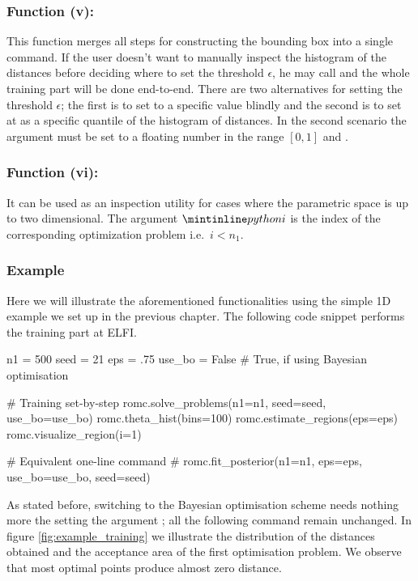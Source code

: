 \subsubsection*{Function (v): }

This function merges all steps for constructing the bounding box into
a single command. If the user doesn't want to manually inspect the
histogram of the distances before deciding where to set the threshold
$\epsilon$, he may call  and the whole
training part will be done end-to-end. There are two alternatives for
setting the threshold $\epsilon$; the first is to set to a specific
value blindly and the second is to set at as a specific quantile of
the histogram of distances. In the second scenario the
 argument must be set to a floating number in the
range $[0,1]$ and .

\subsubsection*{Function (vi): }
  
It can be used as an inspection utility for cases where the parametric
space is up to two dimensional. The argument $\pinline{i}$ is the
index of the corresponding optimization problem i.e.\ $i<n_1$.

\subsubsection*{Example}

Here we will illustrate the aforementioned functionalities using the
simple 1D example we set up in the previous chapter. The following
code snippet performs the training part at ELFI.

\begin{pythoncode}
  n1 = 500
  seed = 21
  eps = .75
  use_bo = False # True, if using Bayesian optimisation

  # Training set-by-step
  romc.solve_problems(n1=n1, seed=seed, use_bo=use_bo)
  romc.theta_hist(bins=100)
  romc.estimate_regions(eps=eps)
  romc.visualize_region(i=1)

  # Equivalent one-line command
  # romc.fit_posterior(n1=n1, eps=eps, use_bo=use_bo, seed=seed)
\end{pythoncode}

As stated before, switching to the Bayesian optimisation scheme needs
nothing more the setting the argument ; all the
following command remain unchanged. In figure
\ref{fig:example_training} we illustrate the distribution of the
distances obtained and the acceptance area of the first optimisation
problem. We observe that most optimal points produce almost zero
distance.

